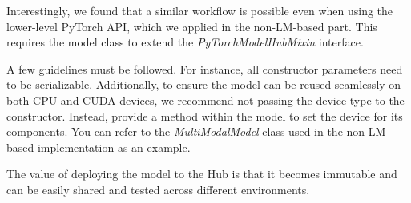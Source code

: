 \documentclass[11pt]{article}
\begin{document}
	Interestingly, we found that a similar workflow is possible even when using the lower-level PyTorch API, which we applied in the non-LM-based part. This requires the model class to extend the \emph{PyTorchModelHubMixin} interface.
	
	A few guidelines must be followed. For instance, all constructor parameters need to be serializable. Additionally, to ensure the model can be reused seamlessly on both CPU and CUDA devices, we recommend not passing the device type to the constructor. Instead, provide a method within the model to set the device for its components. You can refer to the  \emph{MultiModalModel} class used in the non-LM-based implementation as an example.
	
	The value of deploying the model to the Hub is that it becomes immutable and can be easily shared and tested across different environments.
\end{document}
